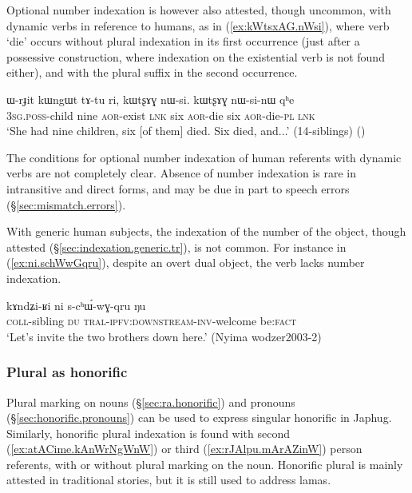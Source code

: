 Optional number indexation is however also attested, though uncommon, with dynamic verbs in reference to humans, as in (\ref{ex:kWtsxAG.nWsi}), where verb `die' occurs without plural indexation in its first occurrence (just after a possessive construction, where indexation on the existential verb  is not found either), and with the plural suffix  in the second occurrence.

\begin{exe}
\ex \label{ex:kWtsxAG.nWsi}
\gll ɯ-rɟit kɯngɯt tɤ-tu ri, kɯtʂɤɣ nɯ-si. kɯtʂɤɣ nɯ-si-nɯ qʰe \\
\textsc{3sg}.\textsc{poss}-child nine \textsc{aor}-exist \textsc{lnk} six \textsc{aor}-die six \textsc{aor}-die-\textsc{pl} \textsc{lnk} \\
\glt `She had nine children, six [of them] died. Six died, and...' (14-siblings) 	()
\end{exe}

The conditions for optional number indexation of human referents with dynamic verbs are not completely clear. Absence of number indexation is rare in intransitive and direct forms, and may be due in part to speech errors (§\ref{sec:mismatch.errors}).


With generic human subjects, the indexation of the number of the object, though attested (§\ref{sec:indexation.generic.tr}), is not common. For instance in (\ref{ex:ni.schWwGqru}), despite an overt dual object, the verb lacks number indexation.

\begin{exe}
\ex \label{ex:ni.schWwGqru}
\gll kɤndʑi-ʁi ni s-cʰɯ́-wɣ-qru ŋu \\
\textsc{coll}-sibling \textsc{du} \textsc{tral}-\textsc{ipfv}:\textsc{downstream}-\textsc{inv}-welcome be:\textsc{fact} \\
\glt `Let's invite the two brothers down here.' (Nyima wodzer2003-2)
\end{exe} 
 
 
\subsubsection{Plural as honorific} \label{sec:honorific.indexation}
Plural marking on nouns (§\ref{sec:ra.honorific}) and pronouns (§\ref{sec:honorific.pronouns}) can be used to express singular honorific in Japhug. Similarly, honorific plural indexation is found with second (\ref{ex:atACime.kAnWrNgWnW}) or third (\ref{ex:rJAlpu.mArAZinW}) person referents, with or without plural  marking on the noun. Honorific plural is mainly attested in traditional stories, but it is still used to address lamas.


